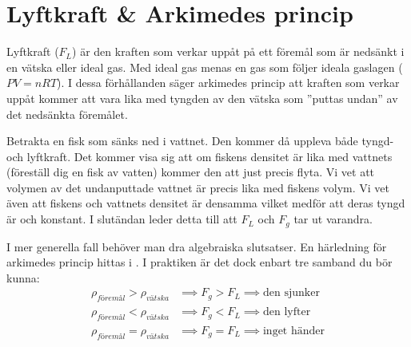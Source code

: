 \section{Lyftkraft \& Arkimedes princip}
Lyftkraft ($F_L$) är den kraften som verkar uppåt på ett föremål som är nedsänkt i en vätska eller ideal gas. Med ideal gas menas en gas som följer ideala gaslagen ($PV=nRT$). I dessa förhållanden säger arkimedes princip att kraften som verkar uppåt kommer att vara lika med tyngden av den vätska som ''puttas undan'' av det nedsänkta föremålet.
\begin{exm}
    Betrakta en fisk som sänks ned i vattnet. Den kommer då uppleva både tyngd- och lyftkraft. Det kommer visa sig att om fiskens densitet är lika med vattnets (föreställ dig en fisk av vatten) kommer den att just precis flyta. Vi vet att volymen av det undanputtade vattnet är precis lika med fiskens volym. Vi vet även att fiskens och vattnets densitet är densamma vilket medför att deras tyngd är och konstant. I slutändan leder detta till att $F_L$ och $F_g$ tar ut varandra.
    \begin{center}
    \end{center}
\end{exm}
I mer generella fall behöver man dra algebraiska slutsatser. En härledning för arkimedes princip hittas i \noref. I praktiken är det dock enbart tre samband du bör kunna:
\begin{align*}
    \rho_{\textit{föremål}} > \rho_{\textit{vätska}} &\implies F_g > F_L \implies \text{den sjunker} \\
    \rho_{\textit{föremål}} < \rho_{\textit{vätska}} &\implies F_g < F_L \implies \text{den lyfter} \\
    \rho_{\textit{föremål}} = \rho_{\textit{vätska}} &\implies F_g = F_L \implies \text{inget händer} 
\end{align*}
